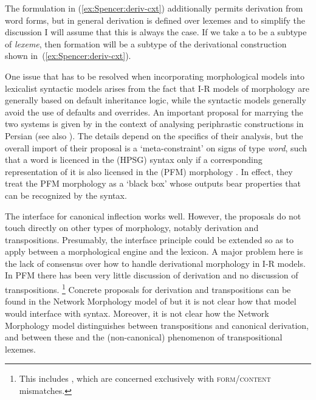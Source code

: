 \documentclass[output=paper]{langsci/langscibook}
\begin{document}
\z
The formulation in (\ref{ex:Spencer:deriv-cxt}) additionally permits derivation from word forms, but in general derivation is defined over lexemes and to simplify the discussion I will assume that this is always the case. If we take a  to be a subtype of \textit{lexeme}, then  formation will be a subtype of the derivational construction shown in~(\ref{ex:Spencer:deriv-cxt}).

One issue that has to be resolved when incorporating morphological models into lexicalist syntactic models arises from the fact that I-R models of morphology are generally based on default inheritance logic, while the syntactic models generally avoid the use of defaults and overrides.  An important proposal for marrying the two systems is given by \citet{Bonami15} in the context of analysing periphrastic constructions in Persian (see also \citealt{Bonami13}). The details depend on the specifics of their analysis, but the overall import of their proposal is a `meta-constraint' on signs of type \textit{word}, such that a word is licenced in the (HPSG) syntax only if a corresponding representation of it is also licensed in the (PFM) morphology %
\citep[32]{Bonami15}%
%
. In effect, they treat the PFM morphology as a `black box' whose outputs bear properties that can be recognized by the  syntax.

The interface for canonical inflection works well. However, the proposals do not touch directly on other types of morphology, notably derivation and transpositions. Presumably, the interface principle could be extended so as to apply between a morphological engine and the  lexicon. A major problem here is the lack of consensus over how to handle derivational morphology in I-R models.  In PFM there has been very little discussion of derivation and no discussion of transpositions.%
\footnote{This includes %
\citet{Stump16,Stump16:MorphMetatheory}%
%
\nocite{Stump16,Stump16:MorphMetatheory}, which are concerned exclusively with \textsc{form/content} mismatches.} %
Concrete proposals for derivation and transpositions can be found in the Network Morphology model of %
 \citet{Brown:Hippisley12:book}  but it is not clear how that model would interface with syntax. Moreover, it is not clear how the Network Morphology model distinguishes between transpositions and canonical derivation, and between these and the (non-canonical) phenomenon of transpositional lexemes.
\end{document}
